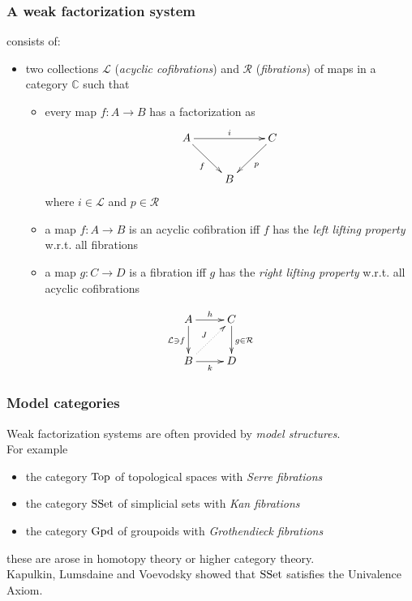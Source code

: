 \documentclass[dvipdfmx]{beamer}
\begin{document}
\begin{frame}
  \frametitle{A weak factorization system
  \nocite{warren2008homotopy,awodey2007homotopy}}
  consists of:
  \begin{itemize}
    \item two collections ${\mathcal L}$ ({\it acyclic cofibrations})
      and ${\mathcal R}$ ({\it fibrations})
      of maps in a category ${\mathbb C}$
      such that
      \begin{itemize}
        \item every map $f : A \to B$ has a factorization as
          \[
            \xymatrix{
              A \ar[rr]^{i} \ar[dr]_{f}
              &
              & C \ar[dl]^{p}
              \\
              & B
              &
            }
          \]
          where $i \in {\mathcal L}$ and $p \in {\mathcal R}$
        \item a map $f : A \to B$ is an acyclic cofibration iff
          $f$ has the {\it left lifting property} w.r.t.
          all fibrations
        \item a map $g : C \to D$ is a fibration iff
          $g$ has the {\it right lifting property} w.r.t.
          all acyclic cofibrations
      \end{itemize}
  \end{itemize}
  \[
    \xymatrix{
      A \ar[r]^{h} \ar[d]_{ {\mathcal L} \ni f}
      & C \ar[d]^{g \in {\mathcal R}}
      \\
      B \ar[r]_{k} \ar@{.>}[ur]^{J}
      & D
    }
  \]
\end{frame}

\begin{frame}
  \frametitle{Model categories}
  Weak factorization systems are often provided
  by {\it model structures}.
  \nocite{Quillen:1967,hovey2007model}
  \\
  For example
  \begin{itemize}
    \item the category ${\rm Top}$ of topological spaces
      with {\it Serre fibrations}
    \item the category ${\rm SSet}$ of simplicial sets
      with {\it Kan fibrations}
    \item the category ${\rm Gpd}$ of groupoids
      with {\it Grothendieck fibrations}
  \end{itemize}
  these are arose in homotopy theory or
  higher category theory.
  \\
  Kapulkin, Lumsdaine and Voevodsky showed that
  ${\rm SSet}$ satisfies the Univalence Axiom.
  \cite{kapulkin2012simplicial,kapulkin2012univalence}
\end{frame}
\end{document}
